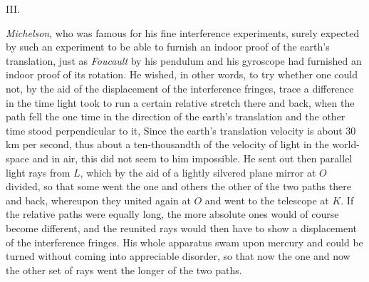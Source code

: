 \documentclass[12pt,a4paper]{article}
\begin{document}
\begin{center}
III.
\end{center}

\emph{Michelson}, who was famous for his fine interference experiments,
surely expected by such an experiment to be able to furnish an indoor proof of
the earth's translation, just as \emph{Foucault} by his pendulum and his
gyroscope had furnished an indoor proof of its rotation. He wished, in other
words, to try whether one could not, by the aid of the displacement of the
interference fringes, trace a difference in the time light took to run a
certain relative stretch there and back, when the path fell the one time in
the direction of the earth's translation and the other time stood
perpendicular to it, Since the earth's translation velocity is about 30 km per
second, thus about a ten-thousandth of the velocity of light in the
world-space and in air, this did not seem to him impossible. He sent out
then parallel light rays from $L$, which by the aid of a lightly silvered
plane mirror at $O$ divided, so that some went the one and others the other of
the two paths there and back, whereupon they united again at $O$ and went to
the telescope at $K$. If the relative paths were equally long, the more
absolute ones would of course become different, and the reunited rays would
then have to show a displacement of the interference fringes. His whole
apparatus swam upon mercury and could be turned without coming into
appreciable disorder, so that now the one and now the other set of rays went
the longer of the two paths.
\end{document}
